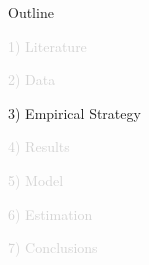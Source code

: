 \documentclass[aspectratio=169]{beamer}
\begin{document}
\begin{frame}[noframenumbering]{Outline}

\Large

\textcolor{lightgray}{1) Literature}

\vspace{4mm}

\textcolor{lightgray}{2) Data}

\vspace{4mm}

3) Empirical Strategy

\vspace{4mm}

\textcolor{lightgray}{4) Results}

\vspace{4mm}

\textcolor{lightgray}{5) Model}

\vspace{4mm}

\textcolor{lightgray}{6) Estimation}

\vspace{4mm}

\textcolor{lightgray}{7) Conclusions}

\end{frame}

\end{document}
